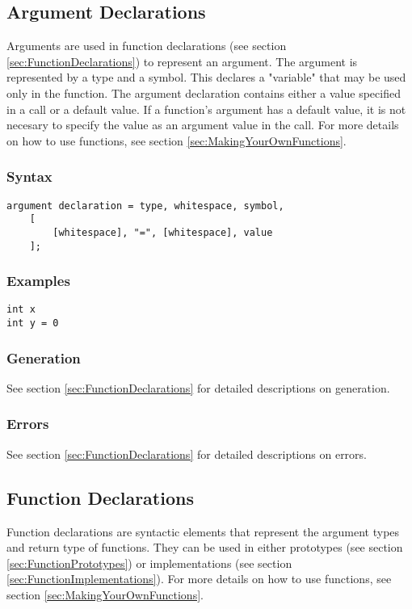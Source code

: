 \documentclass[10pt,a4paper]{article}
\begin{document}
\subsection{Argument Declarations}
Arguments are used in function declarations (see section \ref{sec:FunctionDeclarations}) to represent an argument. The argument is represented by a type and a symbol. This declares a "variable" that may be used only in the function. The argument declaration contains either a value specified in a call or a default value. If a function's argument has a default value, it is not necesary to specify the value as an argument value in the call. For more details on how to use functions, see section \ref{sec:MakingYourOwnFunctions}.

\subsubsection{Syntax}
\begin{verbatim}
argument declaration = type, whitespace, symbol,
    [
        [whitespace], "=", [whitespace], value
    ];
\end{verbatim}

\subsubsection{Examples}
\begin{verbatim}
int x
int y = 0
\end{verbatim}

\subsubsection{Generation}
See section \ref{sec:FunctionDeclarations} for detailed descriptions on generation.

\subsubsection{Errors}
See section \ref{sec:FunctionDeclarations} for detailed descriptions on errors.

\newpage




\subsection{Function Declarations}
Function declarations are syntactic elements that represent the argument types and return type of functions. They can be used in either prototypes (see section \ref{sec:FunctionPrototypes}) or implementations (see section \ref{sec:FunctionImplementations}). For more details on how to use functions, see section \ref{sec:MakingYourOwnFunctions}.
\end{document}
